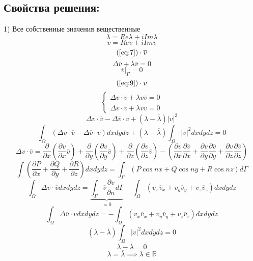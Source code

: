 \documentclass[a4paper]{article}
\begin{document}
\subsection*{Свойства решения:}
1) Все собственные значения вещественные
\[
    \lambda = Re \lambda + i Im \lambda
\]
\[
    v = Re v + i Im v
\]
\[
    (\ref{eq:7}) \cdot \overline{v}
\]
\begin{equation}
    \Delta \overline{v} + \lambda \overline{v} = 0
    \label{eq:9}
\end{equation}
\begin{equation}
    \overline{v} |_{\Gamma} = 0
    \label{eq:10}
\end{equation}
\[
    (\ref{eq:9}) \cdot v
\]
\[
    \begin{cases}
        \Delta v \cdot \overline{v} + \lambda v \overline{v} = 0\\
        \Delta \overline{v} \cdot v + \overline{\lambda} \overline{v} v = 0
    \end{cases}
\]
\[
    \Delta v \cdot \overline{v} - \Delta \overline{v} \cdot v + (\lambda
    - \overline{\lambda}) |v|^2
\]
\[
    \int_{\Omega} (\Delta v \cdot \overline{v} - \Delta \overline{v} \cdot v) dxdydz
    + (\lambda - \overline{\lambda}) \int_{\Omega}|v|^2 dxdydz = 0
\]
\[
    \Delta v \cdot \overline{v} = \frac{\partial}{\partial x} \left(\frac{\partial v}{\partial x} 
    \overline{v}\right) + \frac{\partial}{\partial y} \left( \frac{\partial v}{\partial y} 
    \overline{v} \right) + \frac{\partial}{\partial z} \left(\frac{\partial v}{\partial z} 
    \overline{v} \right) - \left( \frac{\partial v}{\partial x} \frac{\partial \overline{v}}{\partial x} 
    + \frac{\partial v}{\partial y} \frac{\partial \overline{v}}{\partial y} 
    + \frac{\partial v}{\partial z} \frac{\partial \overline{v}}{\partial z} 
    \right)
\]
\[
    \int \left(\frac{\partial P}{\partial x} + \frac{\partial Q}{\partial y} 
    + \frac{\partial R}{\partial z} \right) dxdydz = 
    \int_{\Gamma} (P\cos nx + Q \cos ny + R \cos nz) d\Gamma
\]
\[
    \int_{\Omega} \Delta v \cdot \overline{v} dxdydz = 
    \underbrace{\int_{\Gamma} \overline{v} \frac{\partial v}{\partial n} d \Gamma}_{=0}
    - \int_{\Omega} (v_x \overline{v}_x + v_y \overline{v}_y + v_z \overline{v}_z)
    dxdydz
\]
\[
    \int_{\Omega} \Delta \overline{v} \cdot v dxdydz = 
    - \int_{\Omega} (v_x \overline{v}_x + v_y \overline{v}_y + v_z \overline{v}_z)
    dxdydz
\]
\[
    (\lambda - \overline{\lambda}) \int_{\Omega} |v|^2 dxdydz = 0  
\]
\[
    \lambda - \overline{\lambda} = 0
\]
\[
    \lambda = \overline{\lambda} \implies \lambda \in \mathbb{R}
\]
\end{document}

